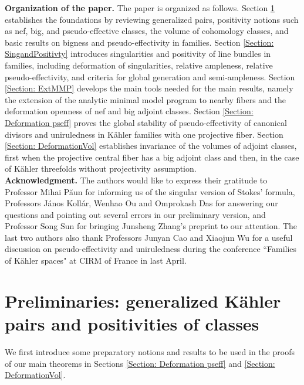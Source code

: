 \documentclass[12pt]{amsart}
\numberwithin{equation}{section}
\theoremstyle{definition}
\theoremstyle{plain}
\newtheorem*{thm A*}{Theorem A}
\newtheorem*{thm B*}{Theorem B}
\newtheorem*{thm C*}{Theorem C}
\newtheorem*{thm D*}{Theorem D}
\theoremstyle{definition}
\renewcommand{\1}{\mathds{1}}
\renewcommand{\>}{\rightarrow}
\begin{document}
\textbf{Organization of the paper.} 
The paper is organized as follows. Section \ref{Preliminaries} establishes the foundations by reviewing generalized pairs, positivity notions such as nef, big, and pseudo-effective classes, the volume of cohomology classes, and basic results on bigness and pseudo-effectivity in families. Section \ref{Section: SingandPositivty} introduces singularities and positivity of line bundles in families, including deformation of singularities, relative ampleness, relative pseudo-effectivity, and criteria for global generation and semi-ampleness. Section \ref{Section: ExtMMP} develops the main tools needed for the main results, namely the extension of the analytic minimal model program to nearby fibers and the deformation openness of nef and big adjoint classes. Section \ref{Section: Deformation pseff} proves the global stability of  pseudo-effectivity of canonical divisors and uniruledness in K\"ahler families with one projective fiber. Section \ref{Section: DeformationVol} establishes invariance of the volumes of adjoint classes, first when the projective central fiber has a big adjoint class and then, in the case of K\"ahler threefolds without projectivity assumption.\\
\textbf{Acknowledgment.} 
The authors would like to express their gratitude to Professor Mihai P\u{a}un for informing us of the singular version of Stokes’ formula, Professors J\'anos Koll\'ar, Wenhao Ou and Omprokash Das for answering our questions and pointing out several errors in our preliminary version, and Professor Song Sun for bringing Junsheng Zhang’s preprint \cite{JunSheng} to our attention. The last two authors also thank Professors Junyan Cao and Xiaojun Wu for a useful discussion on pseudo-effectivity and uniruledness during the conference ``Families of K\"ahler spaces" at CIRM of France in last April.
\section{Preliminaries: generalized K\"ahler pairs and positivities of classes}\label{Preliminaries}
We first introduce some preparatory notions and results to be used in the proofs of our main theorems in Sections \ref{Section: Deformation pseff} and \ref{Section: DeformationVol}.
\end{document}
